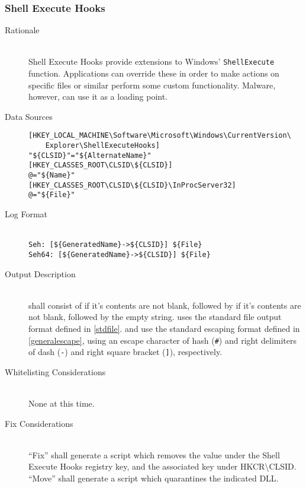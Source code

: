 \subsubsection{Shell Execute Hooks}
\begin{description}
\item[Rationale] \hfill \\
Shell Execute Hooks provide extensions to Windows' \verb|ShellExecute| function.
Applications can override these in order to make actions on specific files or
similar perform some custom functionality. Malware, however, can use it as a
loading point.
\item[Data Sources] \hfill
\vspace{-\baselineskip}
\begin{verbatim}
[HKEY_LOCAL_MACHINE\Software\Microsoft\Windows\CurrentVersion\
    Explorer\ShellExecuteHooks]
"${CLSID}"="${AlternateName}"
[HKEY_CLASSES_ROOT\CLSID\${CLSID}]
@="${Name}"
[HKEY_CLASSES_ROOT\CLSID\${CLSID}\InProcServer32]
@="${File}"
\end{verbatim}
\item[Log Format] \hfill \\
\verb|Seh: [${GeneratedName}->${CLSID}] ${File}| \\
\verb|Seh64: [${GeneratedName}->${CLSID}] ${File}|
\item[Output Description] \hfill \\
 shall consist of  if it's
contents are not blank, followed by  if it's contents are
not blank, followed by the empty string. \var{File} uses the standard file
output format defined in \ref{stdfile}. \var{GeneratedName} and \var{CLSID} use
the standard escaping format defined in \ref{generalescape}, using an escape
character of hash (\verb|#|) and right delimiters of dash (\verb|-|) and
right square bracket (\verb|]|), respectively.
\item[Whitelisting Considerations] \hfill \\
None at this time.
\item[Fix Considerations] \hfill \\
``Fix'' shall generate a script which removes the value under the
Shell Execute Hooks registry key, and the associated key under
HKCR\textbackslash{}CLSID.
``Move'' shall generate a script which quarantines the indicated DLL.
\end{description}

